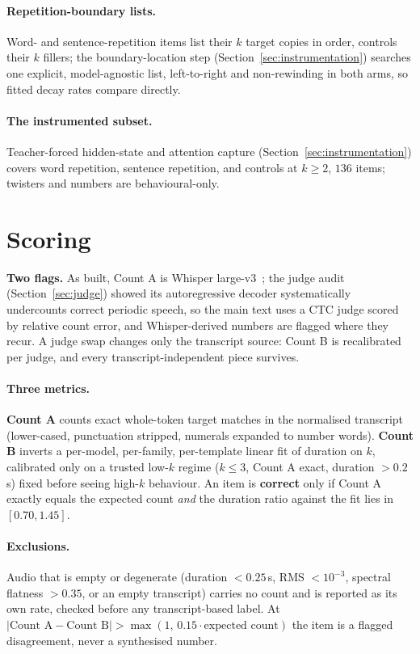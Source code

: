 \paragraph{Repetition-boundary lists.} Word- and sentence-repetition
items list their $k$ target copies in order, controls their $k$ fillers;
the boundary-location step (Section~\ref{sec:instrumentation}) searches
one explicit, model-agnostic list, left-to-right and non-rewinding in
both arms, so fitted decay rates compare directly.

\paragraph{The instrumented subset.} Teacher-forced hidden-state and
attention capture (Section~\ref{sec:instrumentation}) covers word
repetition, sentence repetition, and controls at $k\ge2$, $136$ items;
twisters and numbers are behavioural-only.

\section{Scoring}
\label{sec:scoring}

\noindent\textbf{Two flags.} As built, Count A is Whisper
large-v3~\cite{radford2023whisper}; the judge audit
(Section~\ref{sec:judge}) showed its autoregressive decoder
systematically undercounts correct periodic speech, so the main text uses
a CTC judge scored by relative count error, and Whisper-derived numbers
are flagged where they recur. A judge swap changes only the transcript
source: Count B is recalibrated per judge, and every
transcript-independent piece survives.

\paragraph{Three metrics.} \textbf{Count A} counts exact whole-token
target matches in the normalised transcript (lower-cased, punctuation
stripped, numerals expanded to number words). \textbf{Count B} inverts a
per-model, per-family, per-template linear fit of duration on $k$,
calibrated only on a trusted low-$k$ regime ($k\le3$, Count A exact,
duration $>0.2$\,s) fixed before seeing high-$k$ behaviour. An item is
\textbf{correct} only if Count A exactly equals the expected count
\emph{and} the duration ratio against the fit lies in $[0.70, 1.45]$.

\paragraph{Exclusions.} Audio that is empty or degenerate (duration
$<0.25$\,s, RMS $<10^{-3}$, spectral flatness $>0.35$, or an empty
transcript) carries no count and is reported as its own rate, checked
before any transcript-based label. At
$|\text{Count A} - \text{Count B}| > \max(1,\,
0.15\cdot\text{expected count})$ the item is a flagged disagreement,
never a synthesised number.
